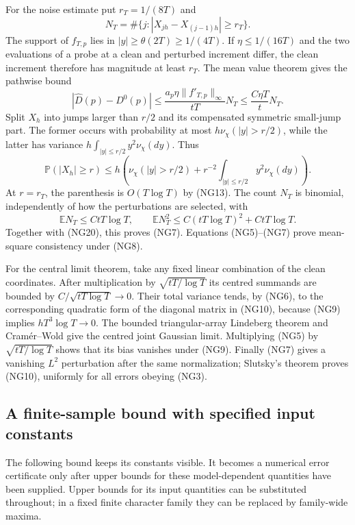 For the noise estimate put $r_T=1/(8T)$ and
\[
 N_T=\#\{j:|X_{jh}-X_{(j-1)h}|\ge r_T\}.
\]
The support of $f_{T,p}$ lies in $|y|\ge\theta(2T)\ge1/(4T)$.
If $\eta\le1/(16T)$ and the two evaluations of a probe at a clean and
perturbed increment differ, the clean increment therefore has magnitude
at least $r_T$.  The mean value theorem gives the pathwise bound
\[
 |\widehat D(p)-D^0(p)|
 \le\frac{a_p\eta\|f'_{T,p}\|_\infty}{tT}N_T
 \le\frac{C\eta T}{t}N_T.                                \tag{NG20}
\]
Split $X_h$ into jumps larger than $r/2$ and its compensated symmetric
small-jump part.  The former occurs with probability at most
$h\nu_\chi(|y|>r/2)$, while the latter has variance
$h\int_{|y|\le r/2}y^2\nu_\chi(dy)$.  Thus
\[
 \mathbb P(|X_h|\ge r)
 \le h\left(\nu_\chi(|y|>r/2)+
             r^{-2}\int_{|y|\le r/2}y^2\nu_\chi(dy)\right).
                                                                  \tag{NG21}
\]
At $r=r_T$, the parenthesis is $O(T\log T)$ by (NG13).  The count $N_T$
is binomial, independently of how the perturbations are selected, with
\[
 \mathbb E N_T\le CtT\log T,\qquad
 \mathbb E N_T^2\le C(tT\log T)^2+CtT\log T.
\]
Together with (NG20), this proves (NG7).  Equations (NG5)--(NG7) prove
mean-square consistency under (NG8).

For the central limit theorem, take any fixed linear combination of the
clean coordinates.  After multiplication by $\sqrt{tT/\log T}$ its
centred summands are bounded by $C/\sqrt{tT\log T}\to0$.
Their total variance tends, by (NG6), to the corresponding quadratic form
of the diagonal matrix in (NG10), because (NG9) implies
$hT^3\log T\to0$.  The bounded triangular-array Lindeberg theorem and
Cram\'er--Wold give the centred joint Gaussian limit.  Multiplying (NG5)
by $\sqrt{tT/\log T}$ shows that its bias vanishes under (NG9).
Finally (NG7) gives a vanishing $L^2$ perturbation after the same
normalization; Slutsky's theorem proves (NG10), uniformly for all errors
obeying (NG3).

\subsection{A finite-sample bound with specified input constants}

The following bound keeps its constants visible. It becomes a numerical error certificate only after upper bounds for these model-dependent quantities have been supplied. Upper bounds for its
input quantities can be substituted throughout; in a fixed finite
character family they can be replaced by family-wide maxima.

